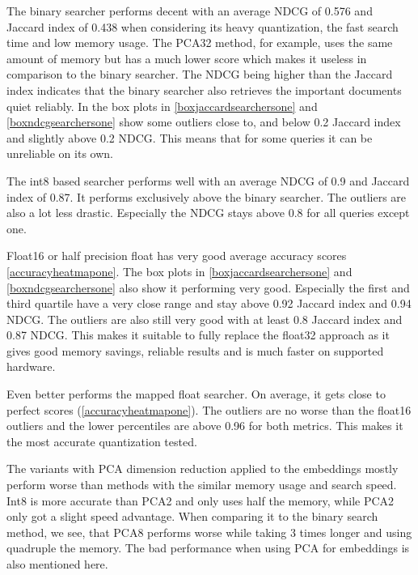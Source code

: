 The binary searcher performs decent with an average NDCG of 0.576 and Jaccard index of 0.438 when considering its heavy quantization, the fast search time and low memory usage. The PCA32 method, for example, uses the same amount of memory but has a much lower score which makes it useless in comparison to the binary searcher. The NDCG being higher than the Jaccard index indicates that the binary searcher also retrieves the important documents quiet reliably. In the box plots in \autoref{boxjaccardsearchersone} and \autoref{boxndcgsearchersone} show some outliers close to, and below 0.2 Jaccard index and slightly above 0.2 NDCG. This means that for some queries it can be unreliable on its own.


The int8 based searcher performs well with an average NDCG of 0.9 and Jaccard index of 0.87. It performs exclusively above the binary searcher. The outliers are also a lot less drastic. Especially the NDCG stays above 0.8 for all queries except one.

Float16 or half precision float has very good average accuracy scores \autoref{accuracyheatmapone}. The box plots in \autoref{boxjaccardsearchersone} and \autoref{boxndcgsearchersone} also show it performing very good. Especially the first and third quartile have a very close range and stay above 0.92 Jaccard index and 0.94 NDCG. The outliers are also still very good with at least 0.8 Jaccard index and 0.87 NDCG. This makes it suitable to fully replace the float32 approach as it gives good memory savings, reliable results and is much faster on supported hardware.

Even better performs the mapped float searcher. On average, it gets close to perfect scores (\autoref{accuracyheatmapone}). The outliers are no worse than the float16 outliers and the lower percentiles are above 0.96 for both metrics. This makes it the most accurate quantization tested.

The variants with PCA dimension reduction applied to the embeddings mostly perform worse than methods with the similar memory usage and search speed. Int8 is more accurate than PCA2 and only uses half the memory, while PCA2 only got a slight speed advantage. When comparing it to the binary search method, we see, that PCA8 performs worse while taking 3 times longer and using quadruple the memory. The bad performance when using PCA for embeddings is also mentioned here.~\cite{thakur2023injectingdomainadaptationlearningtohash}


